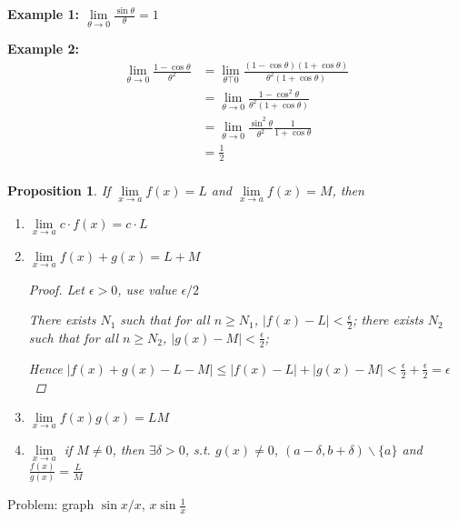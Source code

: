 \documentclass[12pt]{article}
\newcommand{\abs}[1]{\left| #1 \right|}
\theoremstyle{plain}
\newtheorem{proposition}{Proposition}[subsection]
\newcommand{\dlim}{\displaystyle\lim\limits}
\begin{document}
    {\color{Brown}
    \textbf{Example 1: $\dlim_{\theta \to 0} \frac{\sin \theta}{\theta}=1$}

    \textbf{Example 2:} 
        \begin{align*}
            \dlim_{\theta \to 0} \frac{1-\cos \theta}{\theta^2}
            &=\dlim_{\theta \top 0} \frac{(1-\cos \theta)
            (1+ \cos\theta)}{\theta^2(1+\cos\theta)}\\
            &=\dlim_{\theta \to 0} \frac{1-\cos^2 \theta}
            {\theta^2(1+\cos \theta)}\\
            &=\dlim_{\theta \to 0} \frac{\sin^2 \theta}
             {\theta ^2}\frac1{1+\cos \theta}\\
            &=\frac12\\
        \end{align*}}

    \begin{proposition}
        If $\dlim_{x\to a}f(x) = L$ and $
        \dlim_{x\to a}f(x) = M$, then 
        \begin{enumerate}
            \item $\dlim_{x\to a} c\cdot f(x) =c\cdot L$
            \item $\dlim_{x\to a} f(x) + g(x) = L+M$
            \begin{proof}
                Let $\epsilon>0$, use value $\epsilon / 2$
                
                There exists $N_1$ such that for all $n\geq N_1$,
                $\abs{f(x)-L}<\frac{\epsilon}2$;
                there exists $N_2$ such that for all $n\geq N_2$,
                $\abs{g(x)-M}<\frac{\epsilon}2$;

                Hence $\abs{f(x)+g(x) - L-M} \leq \abs{f(x)-L}+\abs{g(x)-M}
                <\frac{\epsilon} 2 + \frac{\epsilon} 2=\epsilon$
            \end{proof}
            \item $\dlim_{x\to a} f(x)g(x)=LM$
            \item $\dlim_{x\to a}$ if $M\neq 0$, 
            then $\exists \delta>0$, s.t. $g(x)\neq 0$,
            $(a-\delta, b+\delta) \backslash \{a\}$ and
                $\frac{f(x)}{g(x)} = \frac LM$
        \end{enumerate}

    \end{proposition}

    Problem: graph $\sin x / x $,  $x\sin \frac 1x$
    \vspace{1in}
\end{document}
